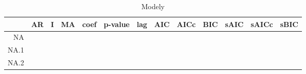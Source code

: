 \begin{table}[ht]
\centering
\begin{tabular}{rlllrllrrrrrr}
  \hline
 & AR & I & MA & coef & p-value & lag & AIC & AICc & BIC & sAIC & sAICc & sBIC \\ 
  \hline
NA &  &  &  &  &  &  &  &  &  &  &  &  \\ 
  NA.1 &  &  &  &  &  &  &  &  &  &  &  &  \\ 
  NA.2 &  &  &  &  &  &  &  &  &  &  &  &  \\ 
   \hline
\end{tabular}
\caption{Modely} 
\end{table}
